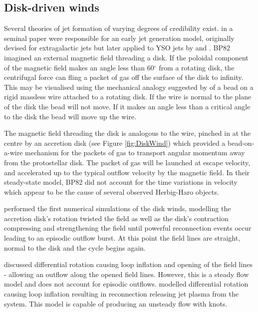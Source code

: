 \subsection{Disk-driven winds}
Several theories of jet formation of varying degrees of credibility exist.
\citet[][; herafter BP82]{1982MNRAS.199..883B} in a seminal paper were responsible for an early jet generation model, originally devised for extragalactic jets but later applied to YSO jets by \citet{1983ApJ...274..677P,1985ApJ...293..216P,1986ApJ...301..571P} and \citet{1989ApJ...342..208K}.
BP82 imagined an external magnetic field threading a disk.
If the poloidal component of the magnetic field makes an angle less than
60$^{\circ}$ from a rotating disk, the centrifugal force can fling a packet of gas off the surface of the disk to infinity.
This may be visualised using the mechanical analogy suggested by \citet{1971MNRAS.152..323H} of a bead on a rigid massless wire attached to a rotating disk. 
If the wire is normal to the plane of the disk the bead will not move.
If it makes an angle less than a critical angle to the disk the bead will move up the wire.

The magnetic field threading the disk is analogous to the wire, pinched in at the centre by an accretion disk (see Figure \ref{fig:DiskWind}) which provided a bead-on-a-wire mechanism for the packets of gas to transport angular momentum away from the protostellar disk.
The packet of gas will be launched at escape velocity, and accelerated up to the typical outflow velocity by the magnetic field.
In their steady-state model, BP82 did not account for the time variations in velocity which appear to be the cause of several observed Herbig-Haro objects.

\citet{1985PASJ...37..515U} performed the first numerical simulations of the disk winds, modelling the accretion disk's rotation twisted the field as well as the disk's contraction compressing and strengthening the field until powerful reconnection events occur leading to an episodic outflow burst. At this point the field lines are straight, normal to the disk and the cycle begins again.

\citet{1995MNRAS.275..244L} discussed differential rotation causing loop inflation and opening of the field lines - allowing an outflow along the opened field lines. However, this is a steady flow model and does not account for episodic outflows.
\citet{1997ApJ...489..199G,1999ApJ...524..142G,1999ApJ...524..159G} modelled differential rotation causing loop inflation resulting in reconnection releasing jet plasma from the system. This model is capable of producing an unsteady flow with knots.

